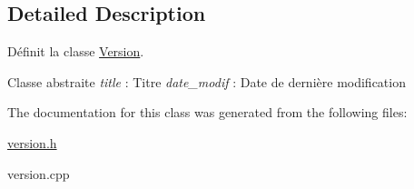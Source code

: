 \subsection{Detailed Description}
Définit la classe \hyperlink{class_version}{Version}. 

Classe abstraite {\itshape title} \+: Titre {\itshape date\+\_\+modif} \+: Date de dernière modification 

The documentation for this class was generated from the following files\+:\begin{DoxyCompactItemize}
\item 
\hyperlink{version_8h}{version.\+h}\item 
version.\+cpp\end{DoxyCompactItemize}
